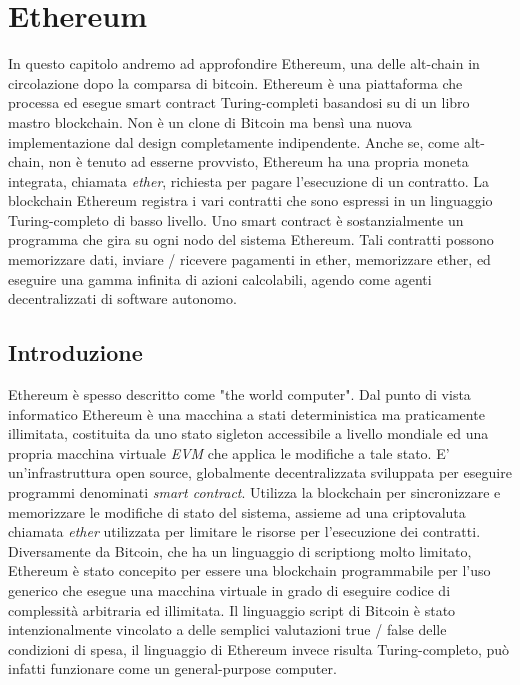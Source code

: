 
\chapter{Ethereum}
\label{ethereum-chapter}
In questo capitolo andremo ad approfondire Ethereum, una delle alt-chain in circolazione dopo la comparsa di bitcoin. Ethereum è una piattaforma che processa ed esegue smart contract Turing-completi basandosi su di un libro mastro blockchain. Non è un clone di Bitcoin ma bensì una nuova implementazione dal design completamente indipendente. Anche se, come alt-chain, non è tenuto ad esserne provvisto, Ethereum ha una propria moneta integrata, chiamata \textit{ether}, richiesta per pagare l'esecuzione di un contratto. La blockchain Ethereum registra i vari contratti che sono espressi in un linguaggio Turing-completo di basso livello. Uno smart contract è sostanzialmente un programma che gira su ogni nodo del sistema Ethereum. Tali contratti possono memorizzare dati, inviare / ricevere pagamenti in ether, memorizzare ether, ed eseguire una gamma infinita di azioni calcolabili, agendo come agenti decentralizzati di software autonomo.

\section{Introduzione}
Ethereum è spesso descritto come "the world computer". Dal punto di vista informatico Ethereum è una macchina a stati deterministica ma praticamente illimitata, costituita da uno stato sigleton accessibile a livello mondiale ed una propria macchina virtuale \textit{EVM} che applica le modifiche a tale stato. E' un'infrastruttura open source, globalmente decentralizzata sviluppata per eseguire programmi denominati \textit{smart contract}. Utilizza la blockchain per sincronizzare e memorizzare le modifiche di stato del sistema, assieme ad una criptovaluta chiamata \textit{ether} utilizzata per limitare le risorse per l'esecuzione dei contratti. 
Diversamente da Bitcoin, che ha un linguaggio di scriptiong molto limitato, Ethereum è stato concepito per essere una blockchain programmabile per l'uso generico che esegue una macchina virtuale in grado di eseguire codice di complessità arbitraria ed illimitata. Il linguaggio script di Bitcoin è stato intenzionalmente vincolato a delle semplici valutazioni true / false delle condizioni di spesa, il linguaggio di Ethereum invece risulta Turing-completo, può infatti funzionare come un general-purpose computer.

